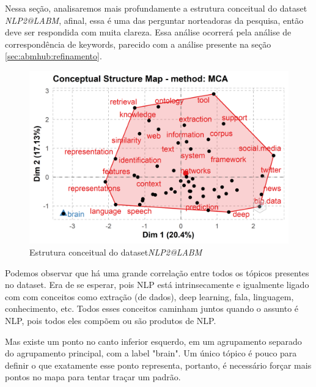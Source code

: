 Nessa seção, analisaremos mais profundamente a estrutura conceitual do dataset \textit{NLP2@LABM}, afinal, essa é uma das perguntar norteadoras da pesquisa, então deve ser respondida com muita clareza. Essa análise ocorrerá pela análise de correspondência de keywords, parecido com a análise presente na seção \ref{sec:abmhub:refinamento}.

 \begin{figure}
    \centering
    \includegraphics[width=1\textwidth]{experiments/ABMHub/PesquisaBibliometrica/NLP/estruturaConceitual.png}
    \caption{Estrutura conceitual do dataset\textit{NLP2@LABM}}
    \label{fig:ABMHub:EC}
\end{figure}

Podemos observar que há uma grande correlação entre todos os tópicos presentes no dataset. Era de se esperar, pois NLP está intrinsecamente e igualmente ligado com com conceitos como extração (de dados), deep learning, fala, linguagem, conhecimento, etc. Todos esses conceitos caminham juntos quando o assunto é NLP, pois todos eles compõem ou são produtos de NLP.

Mas existe um ponto no canto inferior esquerdo, em um agrupamento separado do agrupamento principal, com a label "brain". Um único tópico é pouco para definir o que exatamente esse ponto representa, portanto, é necessário forçar mais pontos no mapa para tentar traçar um padrão.

